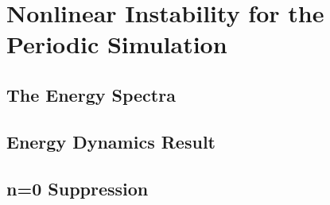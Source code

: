 \chapter{Nonlinear Instability for the Periodic Simulation}

\section{The Energy Spectra}

\section{Energy Dynamics Result}

\section{n=0 Suppression}
